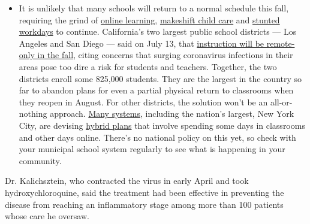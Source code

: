 \begin{itemize}
  \begin{itemize}
  \tightlist
  \item
    It is unlikely that many schools will return to a normal schedule
    this fall, requiring the grind of
    \href{https://www.nytimes3xbfgragh.onion/2020/06/05/us/coronavirus-education-lost-learning.html?action=click\&pgtype=Article\&state=default\&region=MAIN_CONTENT_3\&context=storylines_faq}{online
    learning},
    \href{https://www.nytimes3xbfgragh.onion/2020/05/29/us/coronavirus-child-care-centers.html?action=click\&pgtype=Article\&state=default\&region=MAIN_CONTENT_3\&context=storylines_faq}{makeshift
    child care} and
    \href{https://www.nytimes3xbfgragh.onion/2020/06/03/business/economy/coronavirus-working-women.html?action=click\&pgtype=Article\&state=default\&region=MAIN_CONTENT_3\&context=storylines_faq}{stunted
    workdays} to continue. California's two largest public school
    districts --- Los Angeles and San Diego --- said on July 13, that
    \href{https://www.nytimes3xbfgragh.onion/2020/07/13/us/lausd-san-diego-school-reopening.html?action=click\&pgtype=Article\&state=default\&region=MAIN_CONTENT_3\&context=storylines_faq}{instruction
    will be remote-only in the fall}, citing concerns that surging
    coronavirus infections in their areas pose too dire a risk for
    students and teachers. Together, the two districts enroll some
    825,000 students. They are the largest in the country so far to
    abandon plans for even a partial physical return to classrooms when
    they reopen in August. For other districts, the solution won't be an
    all-or-nothing approach.
    \href{https://bioethics.jhu.edu/research-and-outreach/projects/eschool-initiative/school-policy-tracker/}{Many
    systems}, including the nation's largest, New York City, are
    devising
    \href{https://www.nytimes3xbfgragh.onion/2020/06/26/us/coronavirus-schools-reopen-fall.html?action=click\&pgtype=Article\&state=default\&region=MAIN_CONTENT_3\&context=storylines_faq}{hybrid
    plans} that involve spending some days in classrooms and other days
    online. There's no national policy on this yet, so check with your
    municipal school system regularly to see what is happening in your
    community.
  \end{itemize}
\end{itemize}

Dr. Kalichsztein, who contracted the virus in early April and took
hydroxychloroquine, said the treatment had been effective in preventing
the disease from reaching an inflammatory stage among more than 100
patients whose care he oversaw.

